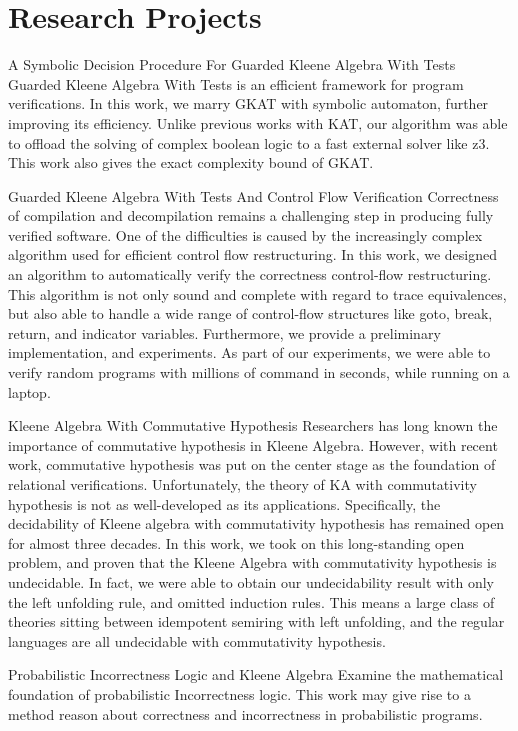 \documentclass[10pt]{moderncv}        %
\let\oldsection=\section
\renewcommand{\section}{%
  \needspace{\baselineskip}
  \oldsection
}
\begin{document}
\section{Research Projects}

{A Symbolic Decision Procedure For Guarded Kleene Algebra With Tests}
{}{}{}
{Guarded Kleene Algebra With Tests is an efficient framework for program verifications. In this work, we marry GKAT with symbolic automaton, further improving its efficiency.
Unlike previous works with KAT, our algorithm was able to offload the solving of complex boolean logic to a fast external solver like z3.
This work also gives the exact complexity bound of GKAT.}

{Guarded Kleene Algebra With Tests And Control Flow Verification}
{}{}{}
{Correctness of compilation and decompilation remains a challenging step in producing fully verified software. 
One of the difficulties is caused by the increasingly complex algorithm used for efficient control flow restructuring.
In this work, we designed an algorithm to automatically verify the correctness control-flow restructuring. This algorithm is not only sound and complete with regard to trace equivalences, but also able to handle a wide range of control-flow structures like goto, break, return, and indicator variables. 
Furthermore, we provide a preliminary implementation, and experiments. As part of our experiments, we were able to verify random programs with millions of command in seconds, while running on a laptop.}

{Kleene Algebra With Commutative Hypothesis}
{}{}{}
{Researchers has long known the importance of commutative hypothesis in Kleene Algebra.
However, with recent work, commutative hypothesis was put on the center stage as the foundation of relational verifications. 
Unfortunately, the theory of KA with commutativity hypothesis is not as well-developed as its applications. 
Specifically, the decidability of Kleene algebra with commutativity hypothesis has remained open for almost three decades.
In this work, we took on this long-standing open problem, and proven that the Kleene Algebra with commutativity hypothesis is undecidable.
In fact, we were able to obtain our undecidability result with only the left unfolding rule, and omitted induction rules. This means a large class of theories sitting between idempotent semiring with left unfolding, and the regular languages are all undecidable with commutativity hypothesis.}

{Probabilistic Incorrectness Logic and Kleene Algebra}
{}{}{}
{Examine the mathematical foundation of probabilistic Incorrectness logic.
This work may give rise to a method reason about correctness and incorrectness in probabilistic programs.}
\end{document}
